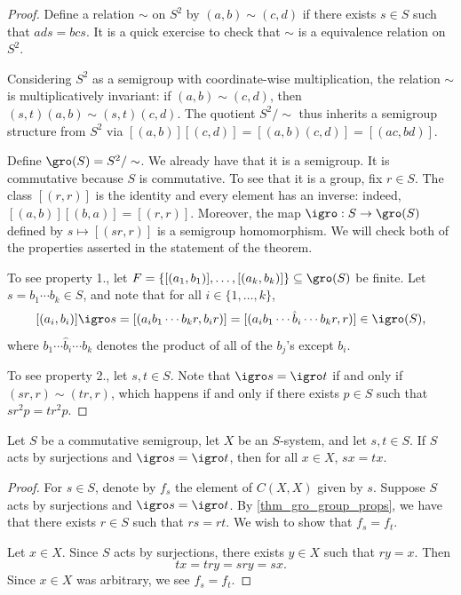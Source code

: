 \begin{proof}
    Define a relation $\sim$ on $S^2$ by $(a,b) \sim (c,d)$ if there exists $s \in S$ such that $ads = bcs$.  It is a quick exercise to check that $\sim$ is a equivalence relation on $S^2$.
    
    Considering $S^2$ as a semigroup with coordinate-wise multiplication, the relation $\sim$ is multiplicatively invariant: if $(a,b) \sim (c,d)$, then $(s,t) (a,b) \sim (s,t) (c,d)$.
    The quotient $S^2 / \sim$ thus inherits a semigroup structure from $S^2$ via $[(a,b)] [(c,d)] = [(a,b) (c,d)] = [(ac,bd)]$.

    Define $\gro(S) = S^2 / \sim$.  We already have that it is a semigroup.  It is commutative because $S$ is commutative.  To see that it is a group, fix $r \in S$.  The class $[(r,r)]$ is the identity and every element has an inverse: indeed, $[(a,b)] [(b,a)] = [(r,r)]$.  Moreover, the map $\igro: S \to \gro(S)$ defined by $s \mapsto [(sr, r)]$ is a semigroup homomorphism.  We will check both of the properties asserted in the statement of the theorem.

    To see property 1., let $F = \{[(a_1, b_1)], \ldots, [(a_k, b_k)]\} \subseteq \gro(S)$ be finite. Let $s = b_1 \cdots b_k \in S$, and note that for all $i \in \{1, \ldots, k\}$,
    \[[(a_i, b_i)] \igro s = [(a_i b_1 \cdots b_k r, b_i r)] = [(a_i b_1 \cdots \hat b_i \cdots b_k r, r)] \in \igro(S),\]
    where $b_1 \cdots \hat b_i \cdots b_k$ denotes the product of all of the $b_j$'s except $b_i$.

    To see property 2., let $s, t \in S$.  Note that $\igro s = \igro t$ if and only if $(sr, r) \sim (tr, r)$, which happens if and only if there exists $p \in S$ such that $sr^2p = tr^2p$.
\end{proof}

\begin{theorem}
\label{thm_igro_same_implies_elts_act_same}
\leanok{}
    Let $S$ be a commutative semigroup, let $X$ be an $S$-system, and let $s, t \in S$.  If $S$ acts by surjections and $\igro s = \igro t$, then for all $x \in X$, $sx = tx$.
\end{theorem}

\begin{proof}
\leanok{}
    For $s \in S$, denote by $f_s$ the element of $C(X,X)$ given by $s$.  Suppose $S$ acts by surjections and $\igro s = \igro t$. By \cref{thm_gro_group_props}, we have that there exists $r \in S$ such that $rs = rt$.  We wish to show that $f_s = f_t$.  

    Let $x \in X$. Since $S$ acts by surjections, there exists $y \in X$ such that $ry = x$.  Then
    \[tx = try = sry = sx.\]
    Since $x \in X$ was arbitrary, we see $f_s = f_t$.
\end{proof}

